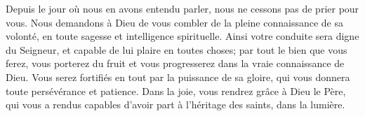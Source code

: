 Depuis le jour où nous en avons entendu parler,
	nous ne cessons pas de prier pour vous.
Nous demandons à Dieu de vous combler de la pleine connaissance de sa volonté,
	en toute sagesse et intelligence spirituelle.
Ainsi votre conduite sera digne du Seigneur,
	et capable de lui plaire en toutes choses;
	par tout le bien que vous ferez, vous porterez du fruit
	et vous progresserez dans la vraie connaissance de Dieu.
Vous serez fortifiés en tout par la puissance de sa gloire,
	qui vous donnera toute persévérance et patience.
Dans la joie, vous rendrez grâce à Dieu le Père,
	qui vous a rendus capables d’avoir part à l’héritage des saints,
		dans la lumière.
